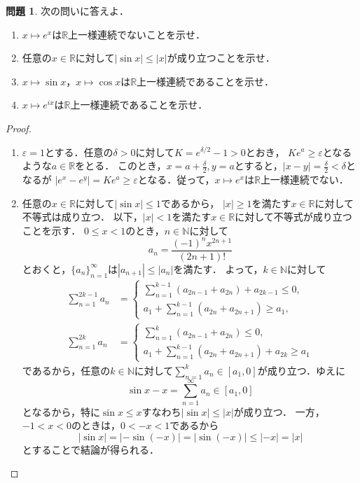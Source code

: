 \documentclass{jsarticle}
\theoremstyle{definition}
\newtheorem{qst}{問題}
\begin{document}
\begin{qst}
次の問いに答えよ．
\begin{enumerate}
\item $x\mapsto e^x$は$\mathbb{R}$上一様連続でないことを示せ．
\item 任意の$x\in\mathbb{R}$に対して$|\sin x|\leq|x|$が成り立つことを示せ．
\item $x\mapsto \sin x$，$x\mapsto \cos x$は$\mathbb{R}$上一様連続であることを示せ．
\item $x\mapsto e^{ix}$は$\mathbb{R}$上一様連続であることを示せ．
\end{enumerate}
\end{qst}
\begin{proof}
\begin{enumerate}
\item
$\varepsilon=1$とする．任意の$\delta>0$に対して$K=e^{\delta/2}-1>0$とおき，
$Ke^a\geq\varepsilon$となるような$a\in\mathbb{R}$をとる．
このとき，$x=a+\frac{\delta}{2},y=a$とすると，$|x-y|=\frac{\delta}{2}<\delta$となるが
$|e^x-e^y|=Ke^a\geq\varepsilon$となる．従って，$x\mapsto e^x$は$\mathbb{R}$上一様連続でない．

\item
任意の$x\in\mathbb{R}$に対して$|\sin x|\leq 1$であるから，
$|x|\geq1$を満たす$x\in\mathbb{R}$に対して不等式は成り立つ．
以下，$|x|<1$を満たす$x\in\mathbb{R}$に対して不等式が成り立つことを示す．
$0\leq x<1$のとき，$n\in\mathbb{N}$に対して
\[
a_n=\frac{(-1)^nx^{2n+1}}{(2n+1)!}
\]
とおくと，$\{a_n\}_{n=1}^\infty$は$|a_{n+1}|\leq|a_n|$を満たす．
よって，$k\in\mathbb{N}$に対して
\begin{align*}
\sum_{n=1}^{2k-1}a_n&=
\begin{cases}
\sum_{n=1}^{k-1}(a_{2n-1}+a_{2n})+a_{2k-1}\leq0, \\
a_1+\sum_{n=1}^{k-1}(a_{2n}+a_{2n+1})\geq a_1,
\end{cases} \\
\sum_{n=1}^{2k}a_n&=
\begin{cases}
\sum_{n=1}^k(a_{2n-1}+a_{2n})\leq0, \\
a_1+\sum_{n=1}^{k-1}(a_{2n}+a_{2n+1})+a_{2k}\geq a_1
\end{cases}
\end{align*}
であるから，任意の$k\in\mathbb{N}$に対して$\sum_{n=1}^ka_n\in[a_1,0]$が成り立つ．ゆえに
\[
\sin x-x=\sum_{n=1}^\infty a_n\in[a_1,0]
\]
となるから，特に$\sin x\leq x$すなわち$|\sin x|\leq|x|$が成り立つ．
一方，$-1<x<0$のときは，$0<-x<1$であるから
\[ |\sin x|=|{-\sin(-x)}|=|\sin(-x)|\leq|{-x}|=|x| \]
とすることで結論が得られる．


\end{enumerate}
\end{proof}
\end{document}
